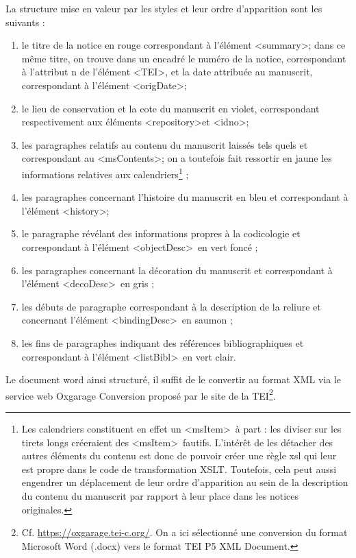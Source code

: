 \documentclass[a4paper,12pt,twoside]{book}
\begin{document}
	La structure mise en valeur par les styles et leur ordre d'apparition sont les suivants : 
	\begin{enumerate}
	    \item le titre de la notice en rouge correspondant à l'élément \textless summary\textgreater ; dans ce même titre, on trouve dans un encadré le numéro de la notice, correspondant à l'attribut n de l'élément \textless TEI\textgreater, et la date attribuée au manuscrit, correspondant à l'élément \textless origDate\textgreater ;
	    \item le lieu de conservation et la cote du manuscrit en violet, correspondant respectivement aux éléments \textless repository\textgreater et \textless idno\textgreater ;
	    \item les paragraphes relatifs au contenu du manuscrit laissés tels quels et correspondant au \textless msContents\textgreater ; on a toutefois fait ressortir en jaune les informations relatives aux calendriers\footnote{Les calendriers constituent en effet un \textless msItem\textgreater~à part : les diviser sur les tirets longs créeraient des \textless msItem\textgreater~fautifs. L'intérêt de les détacher des autres éléments du contenu est donc de pouvoir créer une règle xsl qui leur est propre dans le code de transformation XSLT. Toutefois, cela peut aussi engendrer un déplacement de leur ordre d'apparition au sein de la description du contenu du manuscrit par rapport à leur place dans les notices originales.} ;
	   \item les paragraphes concernant l'histoire du manuscrit en bleu et correspondant à l'élément \textless history\textgreater ;
	   \item le paragraphe révélant des informations propres à la codicologie et correspondant à l'élément \textless objectDesc\textgreater~en vert foncé ;
	   \item les paragraphes concernant la décoration du manuscrit et correspondant à l'élément \textless decoDesc\textgreater~en gris ;
	   \item les débuts de paragraphe correspondant à la description de la reliure et concernant l'élément \textless bindingDesc\textgreater~en saumon ;
	   \item les fins de paragraphes indiquant des références bibliographiques et correspondant à l'élément \textless listBibl\textgreater~en vert clair.
	\end{enumerate}
	
	Le document word ainsi structuré, il suffit de le convertir au format XML via le service web Oxgarage Conversion proposé par le site de la TEI\footnote{Cf. \url{https://oxgarage.tei-c.org/}. On a ici sélectionné une conversion du format Microsoft Word (.docx) vers le format TEI P5 XML Document.}.
	
\end{document}
